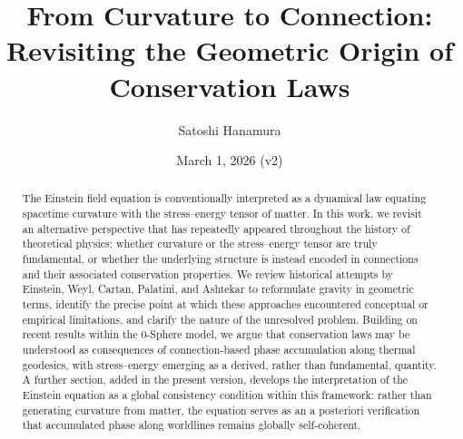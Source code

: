 \documentclass[%
 reprint,
 amsmath,amssymb,
 aps,
 prb,
]{revtex4-2}
\numberwithin{equation}{section}
\begin{document}
\title{From Curvature to Connection:\\
Revisiting the Geometric Origin of Conservation Laws}

\author{Satoshi Hanamura}
\date{March 1, 2026 (v2)}

\begin{abstract}
The Einstein field equation is conventionally interpreted as a dynamical law equating spacetime curvature with the stress--energy tensor of matter. In this work, we revisit an alternative perspective that has repeatedly appeared throughout the history of theoretical physics: whether curvature or the stress--energy tensor are truly fundamental, or whether the underlying structure is instead encoded in connections and their associated conservation properties. We review historical attempts by Einstein, Weyl, Cartan, Palatini, and Ashtekar to reformulate gravity in geometric terms, identify the precise point at which these approaches encountered conceptual or empirical limitations, and clarify the nature of the unresolved problem. Building on recent results within the 0-Sphere model, we argue that conservation laws may be understood as consequences of connection-based phase accumulation along thermal geodesics, with stress--energy emerging as a derived, rather than fundamental, quantity. A further section, added in the present version, develops the interpretation of the Einstein equation as a global consistency condition within this framework: rather than generating curvature from matter, the equation serves as an a posteriori verification that accumulated phase along worldlines remains globally self-coherent.
\end{abstract}

\end{document}
